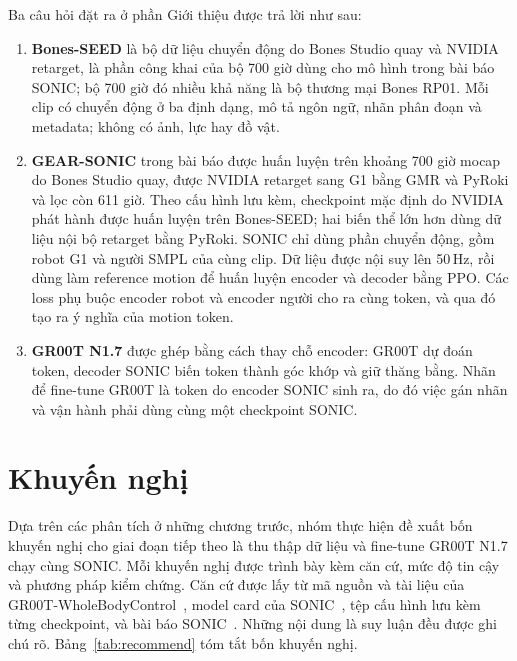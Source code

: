 \documentclass[12pt,a4paper,oneside]{report}
\begin{document}
Ba câu hỏi đặt ra ở phần Giới thiệu được trả lời như sau:
\begin{enumerate}
\item \textbf{Bones-SEED} là bộ dữ liệu chuyển động do Bones Studio quay và NVIDIA retarget, là phần công khai của bộ 700 giờ dùng cho mô hình trong bài báo SONIC; bộ 700 giờ đó nhiều khả năng là bộ thương mại Bones RP01. Mỗi clip có chuyển động ở ba định dạng, mô tả ngôn ngữ, nhãn phân đoạn và metadata; không có ảnh, lực hay đồ vật.
\item \textbf{GEAR-SONIC} trong bài báo được huấn luyện trên khoảng 700 giờ mocap do Bones Studio quay, được NVIDIA retarget sang G1 bằng GMR và PyRoki và lọc còn 611 giờ. Theo cấu hình lưu kèm, checkpoint mặc định do NVIDIA phát hành được huấn luyện trên Bones-SEED; hai biến thể lớn hơn dùng dữ liệu nội bộ retarget bằng PyRoki. SONIC chỉ dùng phần chuyển động, gồm robot G1 và người SMPL của cùng clip. Dữ liệu được nội suy lên 50\,Hz, rồi dùng làm reference motion để huấn luyện encoder và decoder bằng PPO. Các loss phụ buộc encoder robot và encoder người cho ra cùng token, và qua đó tạo ra ý nghĩa của motion token.
\item \textbf{GR00T N1.7} được ghép bằng cách thay chỗ encoder: GR00T dự đoán token, decoder SONIC biến token thành góc khớp và giữ thăng bằng. Nhãn để fine-tune GR00T là token do encoder SONIC sinh ra, do đó việc gán nhãn và vận hành phải dùng cùng một checkpoint SONIC.
\end{enumerate}

\section{Khuyến nghị}
\label{sec:recommend}

Dựa trên các phân tích ở những chương trước, nhóm thực hiện đề xuất bốn khuyến nghị cho giai đoạn tiếp theo là thu thập dữ liệu và fine-tune GR00T N1.7 chạy cùng SONIC. Mỗi khuyến nghị được trình bày kèm căn cứ, mức độ tin cậy và phương pháp kiểm chứng. Căn cứ được lấy từ mã nguồn và tài liệu của GR00T-WholeBodyControl~\cite{wbc}, model card của SONIC~\cite{soniccard}, tệp cấu hình lưu kèm từng checkpoint, và bài báo SONIC~\cite{sonic}. Những nội dung là suy luận đều được ghi chú rõ. Bảng~\ref{tab:recommend} tóm tắt bốn khuyến nghị.
\end{document}

